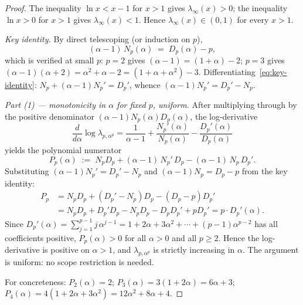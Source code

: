 \documentclass[11pt,a4paper]{article}
\theoremstyle{definition}
\begin{document}
\begin{proof}
The inequality $\ln x < x - 1$ for $x > 1$ gives $\lambda_\infty(x) > 0$; the inequality $\ln x > 0$ for $x > 1$ gives $\lambda_\infty(x) < 1$. Hence $\lambda_\infty(x) \in (0, 1)$ for every $x > 1$.

\medskip

\medskip

\noindent\emph{Key identity.} By direct telescoping (or induction on $p$),
\begin{equation}\label{eq:key-identity}
  (\alpha - 1)\, N_p(\alpha) \;=\; D_p(\alpha) - p,
\end{equation}
which is verified at small $p$: $p=2$ gives $(\alpha-1) = (1+\alpha) - 2$; $p=3$ gives $(\alpha-1)(\alpha+2) = \alpha^2 + \alpha - 2 = (1+\alpha+\alpha^2) - 3$. Differentiating~\eqref{eq:key-identity}: $N_p + (\alpha-1) N_p' = D_p'$, whence $(\alpha-1) N_p' = D_p' - N_p$.

\medskip

\noindent\emph{Part (1) --- monotonicity in $\alpha$ for fixed $p$, uniform.} After multiplying through by the positive denominator $(\alpha-1) N_p(\alpha) D_p(\alpha)$, the log-derivative
\[
  \frac{d}{d\alpha}\log\lambda_{p,\alpha^p}
  = \frac{1}{\alpha - 1} + \frac{N_p'(\alpha)}{N_p(\alpha)} - \frac{D_p'(\alpha)}{D_p(\alpha)}
\]
yields the polynomial numerator
\[
  P_p(\alpha) \;:=\; N_p D_p + (\alpha - 1)\, N_p'\, D_p - (\alpha - 1)\, N_p\, D_p'.
\]
Substituting $(\alpha-1) N_p' = D_p' - N_p$ and $(\alpha-1) N_p = D_p - p$ from the key identity:
\begin{align*}
  P_p &= N_p D_p + (D_p' - N_p) D_p - (D_p - p) D_p' \\
      &= N_p D_p + D_p' D_p - N_p D_p - D_p D_p' + p D_p'
      = p \cdot D_p'(\alpha).
\end{align*}
Since $D_p'(\alpha) = \sum_{j=1}^{p-1} j\,\alpha^{j-1} = 1 + 2\alpha + 3\alpha^2 + \cdots + (p-1)\alpha^{p-2}$ has all coefficients positive, $P_p(\alpha) > 0$ for all $\alpha > 0$ and all $p \geq 2$. Hence the log-derivative is positive on $\alpha > 1$, and $\lambda_{p,\alpha^p}$ is strictly increasing in $\alpha$. The argument is uniform: no scope restriction is needed.

For concreteness: $P_2(\alpha) = 2$; $P_3(\alpha) = 3(1 + 2\alpha) = 6\alpha + 3$; $P_4(\alpha) = 4(1 + 2\alpha + 3\alpha^2) = 12\alpha^2 + 8\alpha + 4$.


\end{proof}
\end{document}
